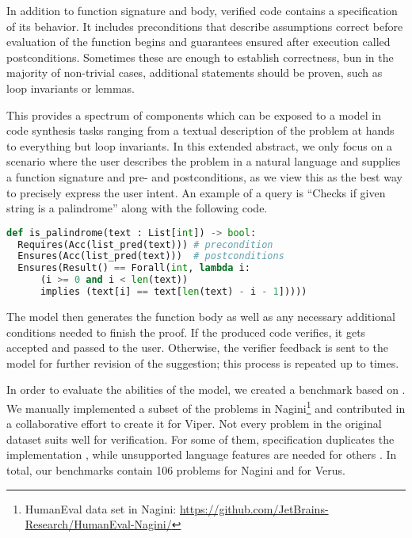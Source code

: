 

In addition to function signature and body, verified code contains a specification of its behavior. 
It includes preconditions that describe assumptions correct before evaluation of the function begins and guarantees ensured after execution called postconditions.
Sometimes these are enough to establish correctness, bun in the majority of non-trivial cases, additional statements should be proven, such as loop invariants or lemmas.


This provides a spectrum of components which can be exposed to a model in code synthesis tasks ranging from a textual description of the problem at hands to everything but loop invariants. 
In this extended abstract, we only focus on a scenario where the user describes the problem in a natural language and supplies a function signature and pre- and postconditions, as we view this as the best way to precisely express the user intent. 
An example of a query is ``Checks if given string is a palindrome'' along with the following code. 

\begin{lstlisting}[language=Python]
def is_palindrome(text : List[int]) -> bool:
  Requires(Acc(list_pred(text))) # precondition
  Ensures(Acc(list_pred(text)))  # postconditions 
  Ensures(Result() == Forall(int, lambda i:
      (i >= 0 and i < len(text)) 
      implies (text[i] == text[len(text) - i - 1]))))
\end{lstlisting}

The model then generates the function body as well as any necessary additional conditions needed to finish the proof. 
If the produced code verifies, it gets accepted and passed to the user. 
Otherwise, the verifier feedback is sent to the model for further revision of the suggestion; this process is repeated up to  times. 


In order to evaluate the abilities of the model, we created a benchmark based on .
We manually implemented a subset of the problems in Nagini\footnote{HumanEval data set in Nagini: \url{https://github.com/JetBrains-Research/HumanEval-Nagini/}} and contributed in a collaborative effort to create it for Viper. 
Not every problem in the original dataset suits well for verification. 
For some of them, specification duplicates the implementation , while unsupported language features are needed for others . 
In total, our benchmarks contain 106 problems for Nagini and  for Verus. 

